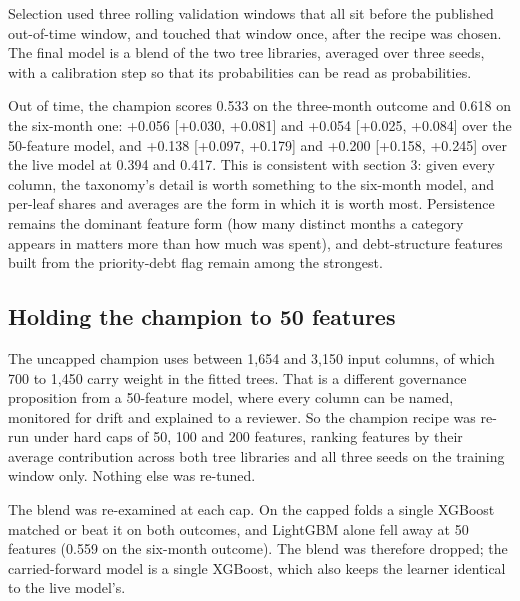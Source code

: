 Selection used three rolling validation windows that all sit before the published out-of-time window, and touched that window once, after the recipe was chosen. The final model is a blend of the two tree libraries, averaged over three seeds, with a calibration step so that its probabilities can be read as probabilities.


Out of time, the champion scores 0.533 on the three-month outcome and 0.618 on the six-month one: +0.056 [+0.030, +0.081] and +0.054 [+0.025, +0.084] over the 50-feature model, and +0.138 [+0.097, +0.179] and +0.200 [+0.158, +0.245] over the live model at 0.394 and 0.417.
This is consistent with section 3: given every column, the taxonomy's detail is worth something to the six-month model, and per-leaf shares and averages are the form in which it is worth most. Persistence remains the dominant feature form (how many distinct months a category appears in matters more than how much was spent), and debt-structure features built from the priority-debt flag remain among the strongest.

\subsection{Holding the champion to 50 features}
The uncapped champion uses between 1,654 and 3,150 input columns, of which 700 to 1,450 carry weight in the fitted trees. That is a different governance proposition from a 50-feature model, where every column can be named, monitored for drift and explained to a reviewer. So the champion recipe was re-run under hard caps of 50, 100 and 200 features, ranking features by their average contribution across both tree libraries and all three seeds on the training window only. Nothing else was re-tuned.

The blend was re-examined at each cap. On the capped folds a single XGBoost matched or beat it on both outcomes, and LightGBM alone fell away at 50 features (0.559 on the six-month outcome). The blend was therefore dropped; the carried-forward model is a single XGBoost, which also keeps the learner identical to the live model's.


